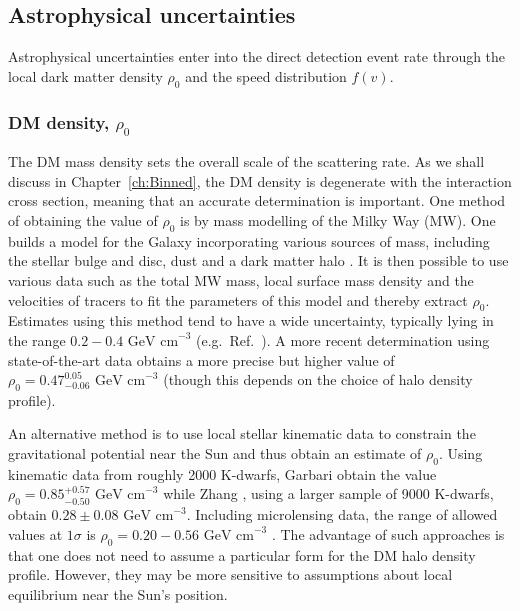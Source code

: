 
\subsection{Astrophysical uncertainties}
\label{sec:DD:astrophysics}

Astrophysical uncertainties enter into the direct detection event rate through the local dark matter density $\rho_0$ and the speed distribution $f(v)$. 

\subsubsection{DM density, $\rho_0$}

The DM mass density sets the overall scale of the scattering rate. As we shall discuss in Chapter~\ref{ch:Binned}, the DM density is degenerate with the interaction cross section, meaning that an accurate determination is important. One method of obtaining the value of $\rho_0$ is by mass modelling of the Milky Way (MW). One builds a model for the Galaxy incorporating various sources of mass, including the stellar bulge and disc, dust and a dark matter halo \cite{Catena:2010}. It is then possible to use various data such as the total MW mass, local surface mass density and the velocities of tracers  to fit the parameters of this model and thereby extract $\rho_0$. Estimates using this method tend to have a wide uncertainty, typically lying in the range \(0.2 - 0.4 \textrm{ GeV cm}^{-3}\) (e.g.\ Ref.\ \cite{Catena:2010,Weber:2010}). A more recent determination using state-of-the-art data obtains a more precise but higher value of $\rho_0 = 0.47_{-0.06}^{0.05} \textrm{ GeV cm}^{-3}$ \cite{Nesti:2013} (though this depends on the choice of halo density profile). 

An alternative method is to use local stellar kinematic data to constrain the gravitational potential near the Sun and thus obtain an estimate of $\rho_0$. Using kinematic data from roughly 2000 K-dwarfs, Garbari \etal \cite{Garbari:2012} obtain the value \(\rho_0 = 0.85_{-0.50}^{+0.57} \textrm{ GeV cm}^{-3}\) while Zhang \etal, using a larger sample of 9000 K-dwarfs, obtain $0.28\pm0.08 \textrm{ GeV cm}^{-3}$. Including microlensing data, the range of allowed values at $1\sigma$ is $\rho_0 = 0.20-0.56 \textrm{ GeV cm}^{-3}$ \cite{Iocco:2011}. The advantage of such approaches is that one does not need to assume a particular form for the DM halo density profile. However, they may be more sensitive to assumptions about local equilibrium near the Sun's position.

